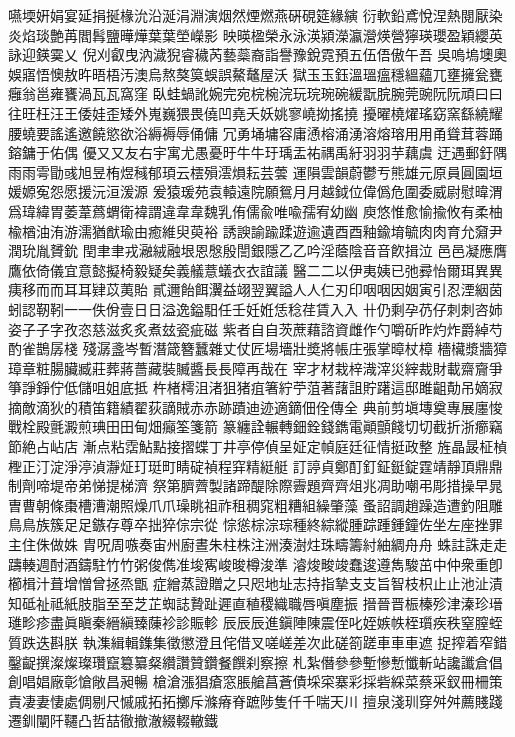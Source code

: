 嚥堧姸娟宴延捐挻椽沇沿涎涓淵演烟然煙燃燕硏硯筵緣縯
衍軟鉛鳶悅涅熱閱厭染炎焰琰艶苒閻髥鹽曄燁葉葉塋嶸影
映暎楹榮永泳渶潁濚瀛瀯煐營獰瑛瓔盈穎纓英詠迎鍈霙乂
倪刈叡曳汭濊猊睿穢芮藝蘂裔詣譽豫銳霓預五伍俉傲午吾
吳嗚塢墺奧娛寤悟懊敖旿晤梧汚澳烏熬獒筽蜈誤鰲鼇屋沃
獄⽟玉鈺溫瑥瘟穩縕蘊兀壅擁瓮甕癰翁邕雍饔渦⽡瓦窩窪
臥蛙蝸訛婉完宛梡椀浣玩琓琬碗緩翫脘腕莞豌阮阮頑⽈曰
往旺枉汪王倭娃歪矮外嵬巍猥畏僥凹堯夭妖姚寥嶢拗搖撓
擾曜橈燿瑤窈窯繇繞耀腰蟯要謠遙邀饒慾欲浴縟褥辱俑傭
冗勇埇墉容庸慂榕涌湧溶熔瑢⽤用甬聳茸蓉踊鎔鏞于佑偶
優⼜又友右宇寓尤愚憂旴⽜牛玗瑀盂祐禑禹紆⽻羽芋藕虞
迂遇郵釪隅⾬雨雩勖彧旭昱栯煜稶郁頊云橒殞澐熉耘芸蕓
運隕雲韻蔚鬱亐熊雄元原員圓園垣媛嫄寃怨愿援沅洹湲源
爰猿瑗苑袁轅遠院願鴛⽉月越鉞位偉僞危圍委威尉慰暐渭
爲瑋緯胃萎葦蔿蝟衛褘謂違⾱韋魏乳侑儒兪唯喩孺宥幼幽
庾悠惟愈愉揄攸有柔柚楡楢油洧游濡猶猷瑜由癒維臾萸裕
誘諛諭踰蹂遊逾遺⾣酉釉鍮堉毓⾁肉育允奫尹潤玧胤贇鈗
閏⾀聿戎瀜絨融垠恩慇殷誾銀隱⼄乙吟淫蔭陰⾳音飮揖泣
⾢邑凝應膺鷹依倚儀宜意懿擬椅毅疑矣義艤薏蟻⾐衣誼議
醫⼆二以伊夷姨已弛彛怡爾珥異異痍移⽽而⽿耳肄苡荑貽
貳邇飴餌瀷益翊翌翼謚⼈人仁刃印咽咽因姻寅引忍湮絪茵
蚓認靭靷⼀一佚佾壹⽇日溢逸鎰馹任壬妊姙恁稔荏賃⼊入
卄仍剩孕芿仔刺刺咨姉姿⼦子字孜恣慈滋炙炙煮玆瓷疵磁
紫者⾃自茨蔗藉諮資雌作勺嚼斫昨灼炸爵綽芍酌雀鵲孱棧
殘潺盞岑暫潛箴簪蠶雜丈仗匠場墻壯奬將帳庄張掌暲杖樟
檣欌漿牆獐璋章粧腸臟臧莊葬蔣薔藏裝贓醬⾧長障再哉在
宰才材栽梓渽滓災縡裁財載齋齎爭箏諍錚佇低儲咀姐底抵
杵楮樗沮渚狙猪疽箸紵苧菹著藷詛貯躇這邸雎齟勣吊嫡寂
摘敵滴狄的積笛籍績翟荻謫賊⾚赤跡蹟迪迹適鏑佃佺傳全
典前剪塡塼奠專展廛悛戰栓殿氈澱煎琠⽥田甸畑癲筌箋箭
篆纏詮輾轉鈿銓錢鐫電顚顫餞切切截折浙癤竊節絶占岾店
漸点粘霑鮎點接摺蝶丁井亭停偵呈姃定幀庭廷征情挺政整
旌晶晸柾楨檉正汀淀淨渟湞瀞炡玎珽町睛碇禎程穽精綎艇
訂諪貞鄭酊釘鉦鋌錠霆靖靜頂⿍鼎制劑啼堤帝弟悌提梯濟
祭第臍薺製諸蹄醍除際霽題⿑齊俎兆凋助嘲弔彫措操早晁
曺曹朝條棗槽漕潮照燥⽖爪璪眺祖祚租稠窕粗糟組繰肇藻
蚤詔調趙躁造遭釣阻雕⿃鳥族簇⾜足鏃存尊卒拙猝倧宗從
悰慫棕淙琮種終綜縱腫踪踵鍾鐘佐坐左座挫罪主住侏做姝
胄呪周嗾奏宙州廚晝朱柱株注洲湊澍炷珠疇籌紂紬綢⾈舟
蛛註誅⾛走躊輳週酎酒鑄駐⽵竹粥俊儁准埈寯峻晙樽浚準
濬焌畯竣蠢逡遵雋駿茁中仲衆重卽櫛楫汁葺增憎曾拯烝甑
症繒蒸證贈之只咫地址志持指摯⽀支旨智枝枳⽌止池沚漬
知砥祉祗紙肢脂⾄至芝芷蜘誌贄趾遲直稙稷織職唇嗔塵振
搢晉晋桭榛殄津溱珍瑨璡畛疹盡眞瞋秦縉縝臻蔯袗診賑軫
⾠辰辰進鎭陣陳震侄叱姪嫉帙桎瓆疾秩窒膣蛭質跌迭斟朕
執潗緝輯鏶集徵懲澄且侘借叉嗟嵯差次此磋箚蹉⾞車車遮
捉搾着窄錯鑿齪撰澯燦璨瓚竄簒纂粲纘讚贊鑽餐饌刹察擦
札紮僭參參塹慘慙懺斬站讒讖倉倡創唱娼廠彰愴敞昌昶暢
槍滄漲猖瘡窓脹艙菖蒼債埰寀寨彩採砦綵菜蔡采釵冊柵策
責凄妻悽處倜剔尺慽戚拓拓擲斥滌瘠脊蹠陟隻仟千喘天川
擅泉淺玔穿⾇舛薦賤踐遷釧闡阡韆凸哲喆徹撤澈綴輟轍鐵
